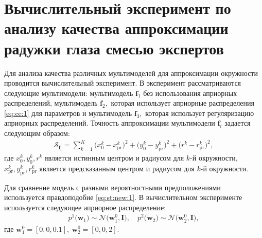 \section{Вычислительный эксперимент по анализу качества аппроксимации радужки глаза смесью экспертов}
Для анализа качества различных мультимоделей для аппроксимации окружности проводится вычислительный эксперимент.
В эксперимент рассматриваются следующие мультимодели: мультимодель $\textbf{f}_1$ без использования априорных распределений, мультимодель $\textbf{f}_2,$ которая использует априорные распределения \eqref{eq:ce:1} для параметров и мультимодель $\textbf{f}_3,$ которая использует регуляризацию априорных распределений.
Точность аппроксимации мультимодели $\textbf{f}_i$ задается следующим образом:
\[
\label{eq:ce:ex:0:1}
\begin{aligned}
\mathcal{S}_{\textbf{f}_i} = \sum_{k=1}^{K}\bigr(x^{k}_{0}-x^{k}_{\text{pr}}\bigr)^2+\bigr(y^{k}_{0}-y^{k}_{\text{pr}}\bigr)^2+\bigr(r^{k}-r^{k}_{\text{pr}}\bigr)^2,
\end{aligned}
\]
где $x^{k}_0, y^{k}_0, r^{k}$ является истинным центром и радиусом для $k$-й окружности, $x^{k}_{\text{pr}}, y^{k}_{\text{pr}}, r^{k}_{\text{pr}}$ является предсказанным центром и радиусом для $k$-й окружности.

Для сравнение модель с разными вероятностными предположениями используется правдоподобие  \eqref{eq:st:new:1}.
В вычислительном эксперименте используется следующее априорное распределение:
\[
\label{eq:ce:1}
\begin{aligned}
p^{1}\bigr(\textbf{w}_1\bigr)\sim\mathcal{N}\bigr(\textbf{w}^{0}_{1}, \textbf{I}\bigr), \quad p^{2}\bigr(\textbf{w}_2\bigr)\sim\mathcal{N}\bigr(\textbf{w}^{0}_{2}, \textbf{I}\bigr),
\end{aligned}
\]
где $\textbf{w}^{0}_1 = [0, 0, 0.1],\ \textbf{w}^{0}_2 = [0, 0, 2]$.

